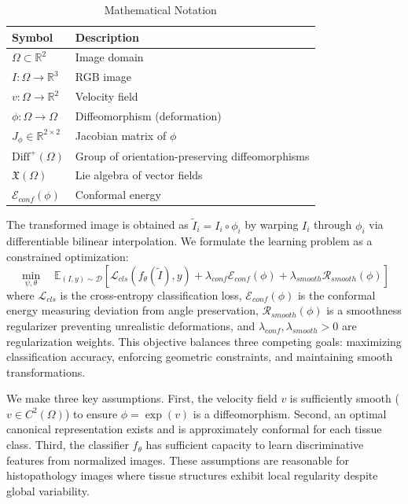 \begin{table}[t]
\centering
\caption{Mathematical Notation}
\label{tab:notation}
\begin{tabular}{ll}
\hline
\textbf{Symbol} & \textbf{Description} \\
\hline
$\Omega \subset \mathbb{R}^2$ & Image domain \\
$I: \Omega \rightarrow \mathbb{R}^3$ & RGB image \\
$v: \Omega \rightarrow \mathbb{R}^2$ & Velocity field \\
$\phi: \Omega \rightarrow \Omega$ & Diffeomorphism (deformation) \\
$J_\phi \in \mathbb{R}^{2 \times 2}$ & Jacobian matrix of $\phi$ \\
$\text{Diff}^+(\Omega)$ & Group of orientation-preserving diffeomorphisms \\
$\mathfrak{X}(\Omega)$ & Lie algebra of vector fields \\
$\mathcal{E}_{conf}(\phi)$ & Conformal energy \\
\hline
\end{tabular}
\end{table}

The transformed image is obtained as $\tilde{I}_i = I_i \circ \phi_i$ by warping $I_i$ through $\phi_i$ via differentiable bilinear interpolation. We formulate the learning problem as a constrained optimization:
\begin{equation}
\min_{\psi, \theta} \quad \mathbb{E}_{(I,y) \sim \mathcal{D}} \left[ \mathcal{L}_{cls}(f_\theta(\tilde{I}), y) + \lambda_{conf} \mathcal{E}_{conf}(\phi) + \lambda_{smooth} \mathcal{R}_{smooth}(\phi) \right]
\label{eq:objective}
\end{equation}
where $\mathcal{L}_{cls}$ is the cross-entropy classification loss, $\mathcal{E}_{conf}(\phi)$ is the conformal energy measuring deviation from angle preservation, $\mathcal{R}_{smooth}(\phi)$ is a smoothness regularizer preventing unrealistic deformations, and $\lambda_{conf}, \lambda_{smooth} > 0$ are regularization weights. This objective balances three competing goals: maximizing classification accuracy, enforcing geometric constraints, and maintaining smooth transformations.

We make three key assumptions. First, the velocity field $v$ is sufficiently smooth ($v \in C^2(\Omega)$) to ensure $\phi = \exp(v)$ is a diffeomorphism. Second, an optimal canonical representation exists and is approximately conformal for each tissue class. Third, the classifier $f_\theta$ has sufficient capacity to learn discriminative features from normalized images. These assumptions are reasonable for histopathology images where tissue structures exhibit local regularity despite global variability.

